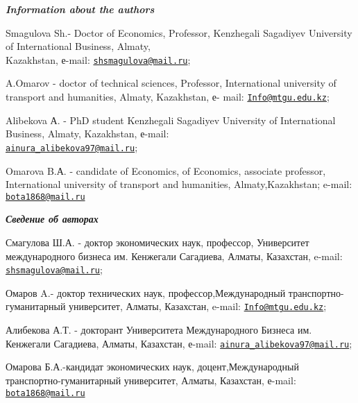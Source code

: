 \begin{authorinfo}
\emph{{\bfseries Information about the authors}}

Smagulova Sh.- Doctor of Economics, Professor, Kenzhegali Sagadiyev
University of International Business, Almaty, \\Kazakhstan, е-mail:
\href{mailto:shsmagulova@mail.ru}{\nolinkurl{shsmagulova@mail.ru}};

A.Omarov - doctor of technical sciences, Professor, International
university of transport and humanities, Almaty, Kazakhstan, е- mail:
\href{mailto:Info@mtgu.edu.kz}{\nolinkurl{Info@mtgu.edu.kz}};

Alibekova А. - PhD student Kenzhegali Sagadiyev University of
International Business, Almaty, Kazakhstan, е-mail:\\
\href{mailto:ainura_alibekova97@mail.ru}{\nolinkurl{ainura\_alibekova97@mail.ru}};

Omarova B.А. - candidate of Economics, of Economics, associate
professor, International university of transport and humanities,
Almaty,Kazakhstan; e-mail:
\href{mailto:bota1868@mail.ru}{\nolinkurl{bota1868@mail.ru}}

\emph{{\bfseries Сведение об авторах}}

Смагулова Ш.А. - доктор экономических наук, профессор, Университет
международного бизнеса им. Кенжегали Сагадиева, Алматы, Казахстан,
e-mail:
\href{mailto:shsmagulova@mail.ru}{\nolinkurl{shsmagulova@mail.ru}};

Омаров A.- доктор технических наук, профессор,Международный
транспортно-гуманитарный университет, Алматы, Казахстан, e-mail:
\href{mailto:Info@mtgu.edu.kz}{\nolinkurl{Info@mtgu.edu.kz}};

Алибекова А.Т. - докторант Университета Международного Бизнеса им.
Кенжегали Сагадиева, Алматы, Казахстан, е-mail:
\href{mailto:ainura_alibekova97@mail.ru}{\nolinkurl{ainura\_alibekova97@mail.ru}};

Омарова Б.А.-кандидат экономических наук, доцент,Международный
транспортно-гуманитарный университет, Алматы, Казахстан, е-mail:
\href{mailto:bota1868@mail.ru}{\nolinkurl{bota1868@mail.ru}}
\end{authorinfo}
